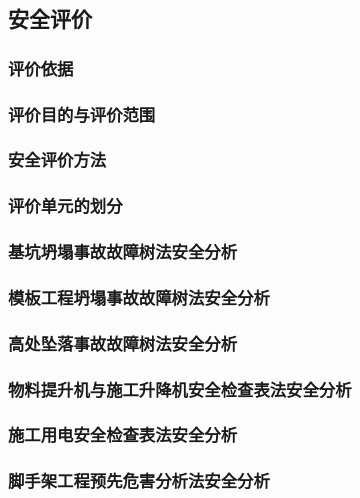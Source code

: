 \subsection{安全评价}
\subsubsection{评价依据}
\subsubsection{评价目的与评价范围}
\subsubsection{安全评价方法}
\subsubsection{评价单元的划分}
\subsubsection{基坑坍塌事故故障树法安全分析}
\subsubsection{模板工程坍塌事故故障树法安全分析}
\subsubsection{高处坠落事故故障树法安全分析}
\subsubsection{物料提升机与施工升降机安全检查表法安全分析}
\subsubsection{施工用电安全检查表法安全分析}
\subsubsection{脚手架工程预先危害分析法安全分析}
